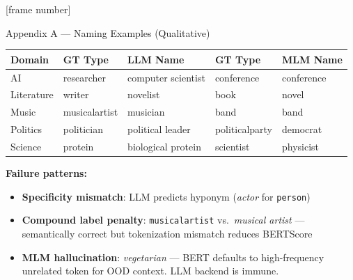\documentclass[aspectratio=169,10pt]{beamer}
\begin{document}
\begin{frame}[plain]
\end{frame}

\appendix
{}[frame number]

\begin{frame}{Appendix A — Naming Examples (Qualitative)}
  \small
  \begin{tabular}{l|ll|ll}
    \toprule
    Domain & \textbf{GT Type} & \textbf{LLM Name} & \textbf{GT Type} & \textbf{MLM Name} \\
    \midrule
    AI         & researcher   & computer scientist & conference  & conference \\
    Literature & writer       & novelist           & book        & novel \\
    Music      & musicalartist & musician          & band        & band \\
    Politics   & politician   & political leader   & politicalparty & democrat \\
    Science    & protein      & biological protein & scientist   & physicist \\
    \bottomrule
  \end{tabular}
  \vspace{0.5em}

  \textbf{Failure patterns:}
  \begin{itemize}
    \item \textbf{Specificity mismatch}: LLM predicts hyponym (\textit{actor} for \texttt{person})
    \item \textbf{Compound label penalty}: \texttt{musicalartist} vs.\ \textit{musical artist} — semantically correct but tokenization mismatch reduces BERTScore
    \item \textbf{MLM hallucination}: \textit{vegetarian} — BERT defaults to high-frequency unrelated token for OOD context. LLM backend is immune.
  \end{itemize}
\end{frame}
\end{document}
